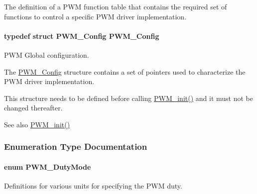 The definition of a P\+W\+M function table that contains the required set of functions to control a specific P\+W\+M driver implementation. 

\paragraph[{P\+W\+M\+\_\+\+Config}]{\setlength{\rightskip}{0pt plus 5cm}typedef struct {\bf P\+W\+M\+\_\+\+Config}  {\bf P\+W\+M\+\_\+\+Config}}\label{_p_w_m_8h_a007c9e36d0b1afcff70e1f2201845236}


P\+W\+M Global configuration. 

The \hyperlink{struct_p_w_m___config}{P\+W\+M\+\_\+\+Config} structure contains a set of pointers used to characterize the P\+W\+M driver implementation.

This structure needs to be defined before calling \hyperlink{_p_w_m_8h_aadae3fe77e36cbf9643a22eeb99fb01e}{P\+W\+M\+\_\+init()} and it must not be changed thereafter.

\begin{DoxySeeAlso}{See also}
\hyperlink{_p_w_m_8h_aadae3fe77e36cbf9643a22eeb99fb01e}{P\+W\+M\+\_\+init()} 
\end{DoxySeeAlso}


\subsubsection{Enumeration Type Documentation}
\paragraph[{P\+W\+M\+\_\+\+Duty\+Mode}]{\setlength{\rightskip}{0pt plus 5cm}enum {\bf P\+W\+M\+\_\+\+Duty\+Mode}}\label{_p_w_m_8h_a6c5ba2703cb9cc02773b5073046c1607}


Definitions for various units for specifying the P\+W\+M duty. 

